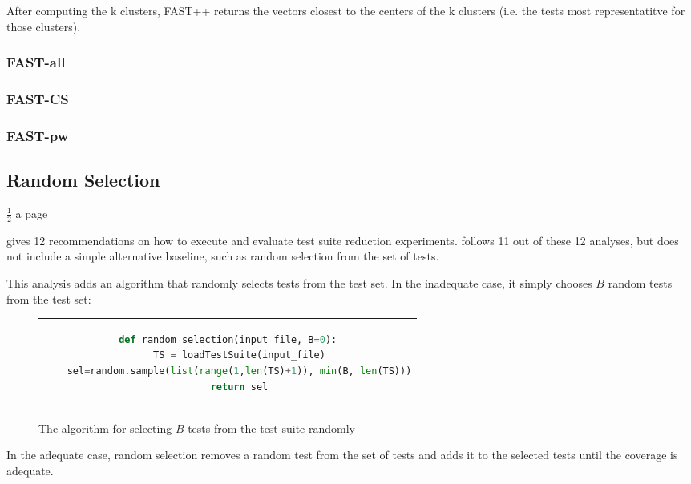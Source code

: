 After computing the k clusters, FAST++ returns the vectors closest to
the centers of the k clusters (i.e. the tests most representatitve for
those clusters).

\subsubsection{FAST-all}

\subsubsection{FAST-CS}

\subsubsection{FAST-pw}

\subsection{Random Selection}

$\frac{1}{2}$ a page

\cite{khan2018systematic} gives 12 recommendations on how to execute and
evaluate test suite reduction experiments. \cite{cruciani2019scalable}
follows 11 out of these 12 analyses, but does not include a simple
alternative baseline, such as random selection from the set of tests.

This analysis adds an algorithm that randomly selects tests from the test
set.
In the inadequate case, it simply chooses $B$ random tests from the
test set:


\begin{figure}[htpb]
\centering
\begin{tabular}{c}
\begin{lstlisting}[language=python]
def random_selection(input_file, B=0):
	TS = loadTestSuite(input_file)
	sel=random.sample(list(range(1,len(TS)+1)), min(B, len(TS)))
	return sel
\end{lstlisting}
\end{tabular}
\caption[Random budget selection]{The algorithm for selecting $B$ tests from the test suite randomly}\label{fig:random-budget-listing}
\end{figure}

In the adequate case, random selection removes a random test from the set
of tests and adds it to the selected tests until the coverage is adequate.


